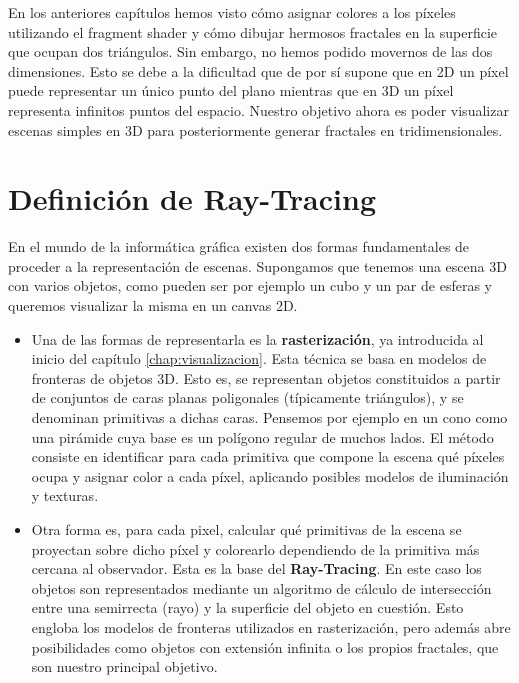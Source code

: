 %
%

En los anteriores capítulos hemos visto cómo asignar colores a los píxeles utilizando el fragment shader y cómo dibujar hermosos fractales en la superficie que ocupan dos triángulos. Sin embargo, no hemos podido movernos de las dos dimensiones. Esto se debe a la dificultad que de por sí supone que en 2D un píxel puede representar un único punto del plano mientras que en 3D un píxel representa infinitos puntos del espacio. Nuestro objetivo ahora es poder visualizar escenas simples en 3D para posteriormente generar fractales en tridimensionales.

\section{Definición de Ray-Tracing}

En el mundo de la informática gráfica existen dos formas fundamentales de proceder a la representación de escenas. Supongamos que tenemos una escena 3D con varios objetos, como pueden ser por ejemplo un cubo y un par de esferas y queremos visualizar la misma en un canvas 2D.
\begin{itemize}
    \item Una de las formas de representarla es la \textbf{rasterización}, ya introducida al inicio del capítulo \ref{chap:visualizacion}. Esta técnica se basa en modelos de fronteras de objetos 3D. Esto es, se representan objetos constituidos a partir de conjuntos de caras planas poligonales (típicamente triángulos), y se denominan primitivas a dichas caras. Pensemos por ejemplo en un cono como una pirámide cuya base es un polígono regular de muchos lados. El método consiste en identificar para cada primitiva que compone la escena qué píxeles ocupa y asignar color a cada píxel, aplicando posibles modelos de iluminación y texturas.
    \item Otra forma es, para cada pixel, calcular qué primitivas de la escena se proyectan sobre dicho píxel y colorearlo dependiendo de la primitiva más cercana al observador. Esta es la base del \textbf{Ray-Tracing}. En este caso los objetos son representados mediante un algoritmo de cálculo de intersección entre una semirrecta (rayo) y la superficie del objeto en cuestión. Esto engloba los modelos de fronteras utilizados en rasterización, pero además abre posibilidades como objetos con extensión infinita o los propios fractales, que son nuestro principal objetivo.
\end{itemize}

